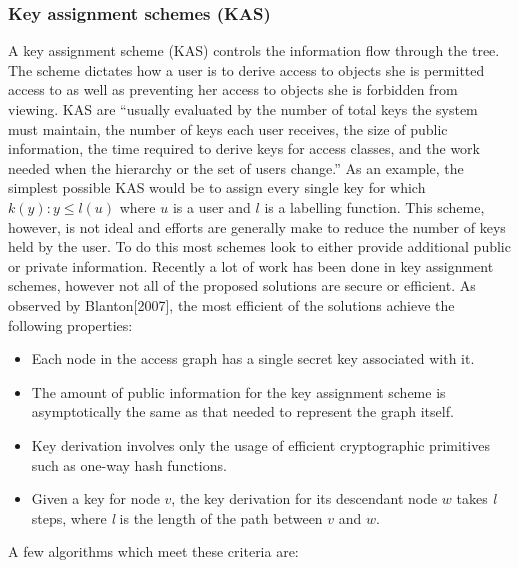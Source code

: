 \documentclass[12pt, titlepage]{article}
\begin{document}
\subsubsection{Key assignment schemes (KAS)}
A key assignment scheme (KAS) controls the information flow through the tree. The scheme dictates how a user is to derive access to objects she is permitted access to as well as preventing her access to objects she is forbidden from viewing. KAS are ``usually evaluated by the number of total keys the system must maintain, the number of keys each user receives, the size of public information, the time required to derive keys for access classes, and the work needed when the hierarchy or the set of users change.''\cite{atallah2005} As an example, the simplest possible KAS would be to assign every single key for which $k(y) : y\le l(u)$ where $u$ is a user and $l$ is a labelling function. This scheme, however, is not ideal and efforts are generally make to reduce the number of keys held by the user. To do this most schemes look to either provide additional public or private information. 
\newline \indent Recently a lot of work has been done in key assignment schemes, however not all of the proposed solutions are secure or efficient. As observed by Blanton[2007], the most efficient of the solutions achieve the following properties:\cite{blanton2007}
\begin{itemize}
\item Each node in the access graph has a single secret key associated with it.
\item The amount of public information for the key assignment scheme is asymptotically the same as that needed to represent the graph itself.
\item Key derivation involves only the usage of efficient cryptographic primitives such
as one-way hash functions.
\item Given a key for node $v$, the key derivation for its descendant node $w$ takes \textit{l} steps, where \textit{l} is the length of the path between $v$ and $w$.
\end{itemize}
 A few algorithms which meet these criteria are:
\end{document}
